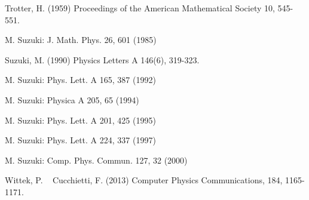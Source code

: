 \begin{thebibliography}{9}


  Trotter, H. (1959) Proceedings of the American Mathematical Society 10, 545-551.

M. Suzuki: J. Math. Phys. 26, 601 (1985)

Suzuki, M. (1990) Physics Letters A 146(6), 319-323.

M. Suzuki: Phys. Lett. A 165, 387 (1992)

M. Suzuki: Physica A 205, 65 (1994)

M. Suzuki: Phys. Lett. A 201, 425 (1995)

M. Suzuki: Phys. Lett. A 224, 337 (1997)

M. Suzuki: Comp. Phys. Commun. 127, 32 (2000)

  

  Wittek, P. ~ Cucchietti, F. (2013) Computer Physics Communications, 184, 1165-1171.
  
\end{thebibliography}